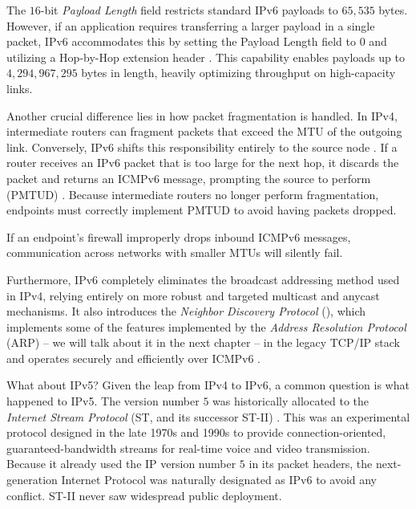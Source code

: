 The \(16\)-bit \emph{Payload Length} field restricts standard IPv6 payloads to \(65,535\) bytes. However, if an application requires transferring a larger payload in a single packet, IPv6 accommodates this by setting the Payload Length field to \(0\) and utilizing a Hop-by-Hop  extension header \cite{rfc2675}. This capability enables payloads up to \(4,294,967,295\) bytes in length, heavily optimizing throughput on high-capacity links.

Another crucial difference lies in how packet fragmentation is handled. In IPv4, intermediate routers can fragment packets that exceed the MTU of the outgoing link. 
Conversely, IPv6 shifts this responsibility entirely to the source node \cite{rfc8200}. If a router receives an IPv6 packet that is too large for the next hop, it discards the packet and returns an ICMPv6  message, prompting the source to perform  (PMTUD) \cite{rfc8201}.
Because intermediate routers no longer perform fragmentation, endpoints must correctly implement PMTUD to avoid having packets dropped. 

\begin{note}{}
    If an endpoint's firewall improperly drops inbound ICMPv6  messages, communication across networks with smaller MTUs will silently fail.
\end{note}

Furthermore, IPv6 completely eliminates the broadcast addressing method used in IPv4, relying entirely on more robust and targeted multicast and anycast mechanisms. 
It also introduces the \emph{Neighbor Discovery Protocol} (), which implements some of the features implemented by the \emph{Address Resolution Protocol} (ARP) -- we will talk about it in the next chapter -- in the legacy TCP/IP stack and operates securely and efficiently over ICMPv6 \cite{rfc4861}.

\begin{observation}{What about IPv5?}
    Given the leap from IPv4 to IPv6, a common question is what happened to IPv5. The version number \(5\) was historically allocated to the \emph{Internet Stream Protocol} (ST, and its successor ST-II) \cite{rfc1819}. This was an experimental protocol designed in the late 1970s and 1990s to provide connection-oriented, guaranteed-bandwidth streams for real-time voice and video transmission. Because it already used the IP version number \(5\) in its packet headers, the next-generation Internet Protocol was naturally designated as IPv6 to avoid any conflict. ST-II never saw widespread public deployment.
\end{observation}

